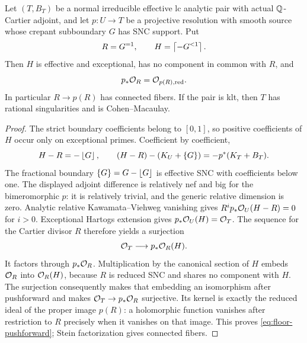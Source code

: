 \begin{lemma}\label{lem:floor-connectedness}
Let \((T,B_T)\) be a normal irreducible effective lc analytic pair with actual
\(\mathbb Q\)-Cartier adjoint, and let \(p:U\to T\) be a projective resolution
with smooth source whose crepant subboundary \(G\) has SNC support.  Put
\[
 R=G^{=1},\qquad H=\left\lceil -G^{<1}\right\rceil.
\]
Then \(H\) is effective and exceptional, has no component in common with
\(R\), and
\begin{equation}\label{eq:floor-pushforward}
 p_*\mathcal O_R=\mathcal O_{p(R),\mathrm{red}}.
\end{equation}
In particular \(R\to p(R)\) has connected fibers.  If the pair is klt,
then \(T\) has rational singularities and is Cohen--Macaulay.
\end{lemma}
\begin{proof}
The strict boundary coefficients belong to \([0,1]\), so positive
coefficients of \(H\) occur only on exceptional primes.  Coefficient by
coefficient,
\[
 H-R=-\left\lfloor G\right\rfloor,
 \qquad (H-R)-(K_U+\{G\})=-p^*(K_T+B_T).
\]
The fractional boundary \(\{G\}=G-\left\lfloor G\right\rfloor\) is effective SNC with
coefficients below one.  The displayed adjoint difference is relatively
nef and big for the bimeromorphic \(p\): it is relatively trivial, and
the generic relative dimension is zero.  Analytic relative
Kawamata--Viehweg vanishing
\cite[Theorem~2.41]{DasHaconPaun2024} gives
\(R^ip_*\mathcal O_U(H-R)=0\) for \(i>0\).  Exceptional Hartogs extension gives
\(p_*\mathcal O_U(H)=\mathcal O_T\).  The sequence for the Cartier divisor \(R\)
therefore yields a surjection
\[
 \mathcal O_T\longrightarrow p_*\mathcal O_R(H).
\]
It factors through \(p_*\mathcal O_R\).  Multiplication by the canonical section
of \(H\) embeds \(\mathcal O_R\) into \(\mathcal O_R(H)\), because \(R\) is reduced
SNC and shares no component with \(H\).  The surjection consequently
makes that embedding an isomorphism after pushforward and makes
\(\mathcal O_T\to p_*\mathcal O_R\) surjective.  Its kernel is exactly the reduced
ideal of the proper image \(p(R)\): a holomorphic function vanishes after
restriction to \(R\) precisely when it vanishes on that image.  This
proves \eqref{eq:floor-pushforward}; Stein factorization gives connected
fibers.


\end{proof}
